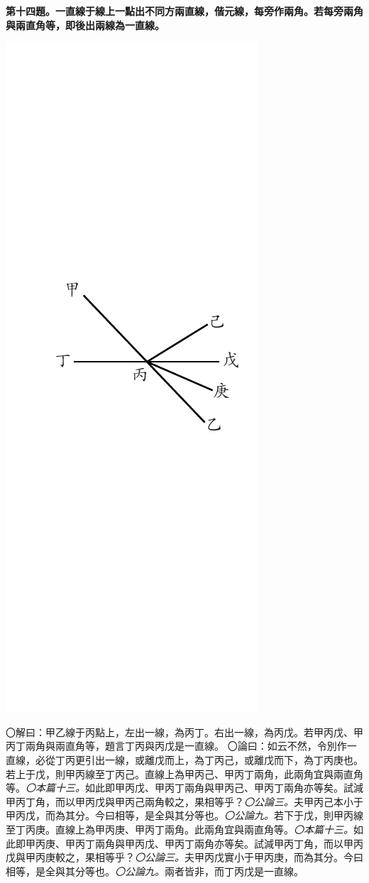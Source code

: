 \documentclass[12pt,b5paper,landscape]{article}
\newcommand{\ccom}[1]{{\footnotesize \emph{〇#1}}}
\newcommand{\bcom}[1]{〇#1}
\newcommand{\cthm}[1]{{
\vspace{8pt}

\bfseries #1}}
\begin{document}
\begin{multicols}{2}
\cthm{第十四題。一直線于線上一點出不同方兩直線，偕元線，每旁作兩角。若每旁兩角與兩直角等，即後出兩線為一直線。}
\begin{center}
\includegraphics[angle=90]{eu59}
\end{center}
\bcom{解曰：甲乙線于丙點上，左出一線，為丙丁。右出一線，為丙戊。若甲丙戊、甲丙丁兩角與兩直角等，題言丁丙與丙戊是一直線。}
\bcom{論曰：如云不然，令別作一直線，必從丁丙更引出一線，或離戊而上，為丁丙己，或離戊而下，為丁丙庚也。若上于戊，則甲丙線至丁丙己。直線上為甲丙己、甲丙丁兩角，此兩角宜與兩直角等。\ccom{本篇十三。}如此即甲丙戊、甲丙丁兩角與甲丙己、甲丙丁兩角亦等矣。試減甲丙丁角，而以甲丙戊與甲丙己兩角較之，果相等乎？\ccom{公論三。}夫甲丙己本小于甲丙戊，而為其分。今曰相等，是全與其分等也。\ccom{公論九。}若下于戊，則甲丙線至丁丙庚。直線上為甲丙庚、甲丙丁兩角。此兩角宜與兩直角等。\ccom{本篇十三。}如此即甲丙庚、甲丙丁兩角與甲丙戊、甲丙丁兩角亦等矣。試減甲丙丁角，而以甲丙戊與甲丙庚較之，果相等乎？\ccom{公論三。}夫甲丙戊實小于甲丙庚，而為其分。今曰相等，是全與其分等也。\ccom{公論九。}兩者皆非，而丁丙戊是一直線。}


\end{multicols}
\end{document}
